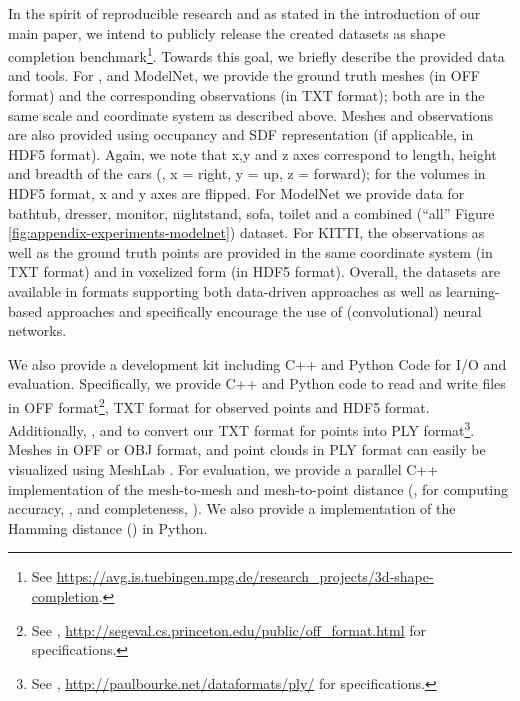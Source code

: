 \documentclass[10pt,letterpaper]{article}
\begin{document}
%
In the spirit of reproducible research and as stated in the introduction of our main paper, we intend to publicly release the created datasets as shape completion benchmark\footnote{See \url{https://avg.is.tuebingen.mpg.de/research_projects/3d-shape-completion}.}. Towards this goal, we briefly describe the provided data and tools. For \clean, \noisy and ModelNet, we provide the ground truth meshes (in OFF format) and the corresponding observations (in TXT format); both are in the same scale and coordinate system as described above. Meshes and observations are also provided using occupancy and SDF representation (if applicable, in HDF5 format). Again, we note that x,y and z axes correspond to length, height and breadth of the cars (\ie, x = right, y = up, z = forward); for the volumes in HDF5 format, x and y axes are flipped. For ModelNet we provide data for bathtub, dresser, monitor, nightstand, sofa, toilet and a combined (``all'' Figure \ref{fig:appendix-experiments-modelnet}) dataset. For KITTI, the observations as well as the ground truth points are provided in the same coordinate system (in TXT format) and in voxelized form (in HDF5 format). Overall, the datasets are available in formats supporting both data-driven approaches as well as learning-based approaches and specifically encourage the use of (convolutional) neural networks.

We also provide a development kit including C++ and Python Code for I/O and evaluation. Specifically, we provide C++ and Python code to read and write files in OFF format\footnote{See \eg, \url{http://segeval.cs.princeton.edu/public/off_format.html} for specifications.}, TXT format for observed points and HDF5 format. Additionally, , and to convert our TXT format for points into PLY format\footnote{See \eg, \url{http://paulbourke.net/dataformats/ply/} for specifications.}. Meshes in OFF or OBJ format, and point clouds in PLY format can easily be visualized using MeshLab \cite{Cignoni2008}. For evaluation, we provide a parallel C++ implementation of the mesh-to-mesh and mesh-to-point distance (\ie, for computing accuracy, \Acc, and completeness, \Compl). We also provide a implementation of the Hamming distance (\Abs) in Python.



\end{document}
